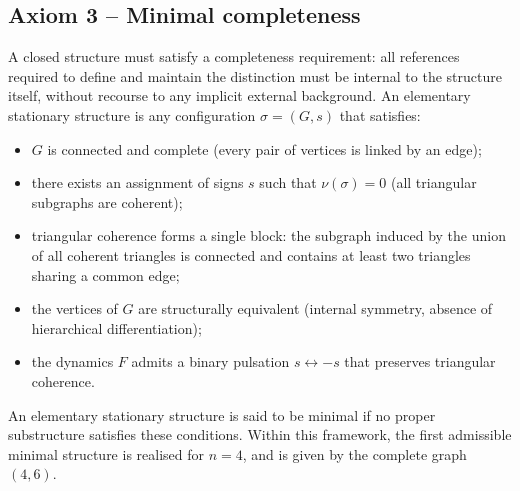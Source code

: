 \documentclass[11pt,a4paper]{article}
\begin{document}
\subsection*{Axiom 3 – Minimal completeness}
A closed structure must satisfy a completeness requirement: all references required to define and maintain the distinction must be internal to the structure itself, without recourse to any implicit external background. An elementary stationary structure is any configuration \(\sigma = (G,s)\) that satisfies:
\begin{itemize}[label=-]
  \item \(G\) is connected and complete (every pair of vertices is linked by an edge);
  \item there exists an assignment of signs \(s\) such that \(\nu(\sigma) = 0\) (all triangular subgraphs are coherent);
  \item triangular coherence forms a single block: the subgraph induced by the union of all coherent triangles is connected and contains at least two triangles sharing a common edge;
  \item the vertices of \(G\) are structurally equivalent (internal symmetry, absence of hierarchical differentiation);
  \item the dynamics \(F\) admits a binary pulsation \(s \leftrightarrow -s\) that preserves triangular coherence.
\end{itemize}
An elementary stationary structure is said to be minimal if no proper substructure satisfies these conditions. Within this framework, the first admissible minimal structure is realised for \(n = 4\), and is given by the complete graph \((4,6)\).
\end{document}
